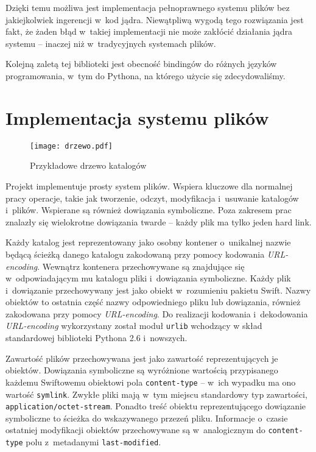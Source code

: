 Dzięki temu możliwa jest implementacja pełnoprawnego systemu plików bez
jakiejkolwiek ingerencji w~kod jądra. Niewątpliwą wygodą tego rozwiązania
jest fakt, że żaden błąd w~takiej implementacji nie może zakłócić działania
jądra systemu -- inaczej niż w~tradycyjnych systemach plików.

Kolejną zaletą tej biblioteki jest obecność bindingów do różnych języków
programowania, w~tym do Pythona, na którego użycie się zdecydowaliśmy.

\section{Implementacja systemu plików}

\begin{figure}
    \centering
    \texttt{[image: drzewo.pdf]}
    \caption{Przykładowe drzewo katalogów}
	\label{fig:drzewo}
\end{figure}

Projekt \cb{} implementuje prosty system plików. Wspiera kluczowe dla normalnej
pracy operacje, takie jak tworzenie, odczyt, modyfikacja i~usuwanie katalogów
i~plików. Wspierane są również dowiązania symboliczne. Poza zakresem prac
znalazły się wielokrotne dowiązania twarde -- każdy plik ma tylko jeden hard
link.

Każdy katalog jest reprezentowany jako osobny kontener o~unikalnej nazwie będącą
ścieżką danego katalogu zakodowaną przy pomocy kodowania \textit{URL-encoding}.
Wewnątrz kontenera przechowywane są znajdujące się w~odpowiadającym mu katalogu
pliki i~dowiązania symboliczne. Każdy plik i~dowiązanie przechowywany jest jako
obiekt w~rozumieniu pakietu Swift. Nazwy obiektów to ostatnia część nazwy
odpowiedniego pliku lub dowiązania, również zakodowana przy pomocy
\textit{URL-encoding}. Do realizacji kodowania i~dekodowania
\textit{URL-encoding} wykorzystany został moduł \texttt{urlib} wchodzący w skład
standardowej biblioteki Pythona 2.6 i~nowszych.

Zawartość plików przechowywana jest jako zawartość reprezentujących je obiektów.
Dowiązania symboliczne są wyróżnione wartością przypisanego każdemu Swiftowemu
obiektowi pola \texttt{content-type} -- w~ich wypadku ma ono wartość
\texttt{symlink}. Zwykłe pliki mają w~tym miejscu standardowy typ zawartości,
\texttt{application/octet-stream}. Ponadto treść obiektu reprezentującego
dowiązanie symboliczne to ścieżka do wskazywanego przezeń pliku. Informacje
o~czasie ostatniej modyfikacji obiektów przechowywane są w~analogicznym do
\texttt{content-type} polu z~metadanymi \texttt{last-modified}.

